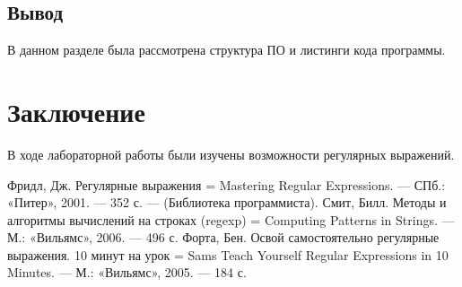 \documentclass[12pt]{report}
\begin{document}
\section{Вывод}
В данном разделе была рассмотрена структура ПО и листинги кода программы.


\chapter*{Заключение}
В ходе лабораторной работы были изучены возможности регулярных выражений.


\begin{thebibliography}{3}
	Фридл, Дж. Регулярные выражения = Mastering Regular Expressions. — СПб.: «Питер», 2001. — 352 с. — (Библиотека программиста). 	
	Смит, Билл. Методы и алгоритмы вычислений на строках (regexp) = Computing Patterns in Strings. — М.: «Вильямс», 2006. — 496 с.
	Форта, Бен. Освой самостоятельно регулярные выражения. 10 минут на урок = Sams Teach Yourself Regular Expressions in 10 Minutes. — М.: «Вильямс», 2005. — 184 с.
\end{thebibliography}
\end{document}
